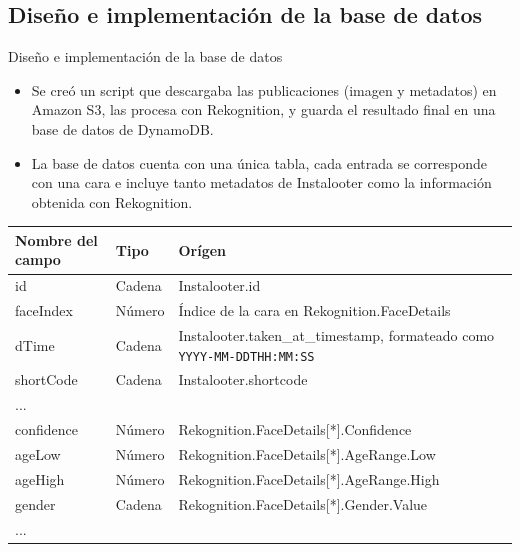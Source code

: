 \documentclass[aspectratio=149]{beamer}
\begin{document}
\subsection{Diseño e implementación de la base de datos}
\begin{frame}[label=bbdd]{Diseño e implementación de la base de datos}
    \begin{itemize}
        \item Se creó un script que descargaba las publicaciones (imagen y metadatos) en Amazon S3, las procesa con Rekognition, y guarda el resultado final en una base de datos de DynamoDB.
        \item La base de datos cuenta con una única tabla, cada entrada se corresponde con una cara e incluye tanto metadatos de Instalooter como la información obtenida con Rekognition.
    \end{itemize}
    {\scriptsize
    \begin{table}[H]
        \vspace{-0.4cm}
        \centering
        \begin{tabular}{|p{}|p{}|p{}|}
        \hline
    	Nombre del campo & Tipo & Orígen \\ \hline
    	id & Cadena & Instalooter.id \\ \hline
    	faceIndex & Número & Índice de la cara en Rekognition.FaceDetails \\ \hline
    	dTime & Cadena & Instalooter.taken\_at\_timestamp, formateado como \texttt{YYYY-MM-DDTHH:MM:SS} \\ \hline
    	shortCode & Cadena & Instalooter.shortcode \\ \hline
    	... & & \\ \hline
    	confidence & Número & Rekognition.FaceDetails{[}*{]}.Confidence \\ \hline
    	ageLow & Número & Rekognition.FaceDetails{[}*{]}.AgeRange.Low \\ \hline
    	ageHigh & Número & Rekognition.FaceDetails{[}*{]}.AgeRange.High \\ \hline
    	gender & Cadena & Rekognition.FaceDetails{[}*{]}.Gender.Value \\ \hline
    	... & & \\ \hline
        \end{tabular}
        \label{tab:dynamodb_table}
    \end{table}
    }
\end{frame}
\end{document}

